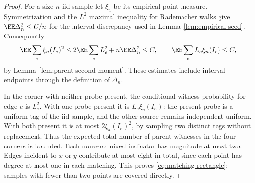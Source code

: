 \documentclass[11pt,letterpaper]{article}
\begin{document}
\begin{proof}
For a size-$n$ iid sample let $\xi_n$ be its empirical point measure.
Symmetrization and the $L^2$ maximal inequality for Rademacher walks
give $\EE\Delta_n^2\le C/n$ for the interval discrepancy used in
Lemma~\ref{lem:empirical-seed}. Consequently
\[
 \EE\sum_e\xi_n(I_e)^2
 \le 2\EE\sum_e L_e^2+n\EE\Delta_n^2\le C,
 \qquad
 \EE\sum_e L_e\xi_n(I_e)\le C,
\]
by Lemma~\ref{lem:parent-second-moment}. These estimates include
interval endpoints through the definition of $\Delta_n$.

In the corner with neither probe present, the conditional witness
probability for edge $e$ is $L_e^2$. With one probe present it is
$L_e\xi_n(I_e)$: the present probe is a uniform tag of the iid
sample, and the other source remains independent uniform.
With both present it is at most $2\xi_n(I_e)^2$, by sampling two
distinct tags without replacement. Thus the expected total number
of parent witnesses in the four corners is bounded. Each nonzero
mixed indicator has magnitude at most two. Edges incident to $x$
or $y$ contribute at most eight in total, since each point has degree
at most one in each matching. This proves
\eqref{eq:matching-rectangle}; samples with fewer than two points
are covered directly.
\end{proof}
\end{document}
